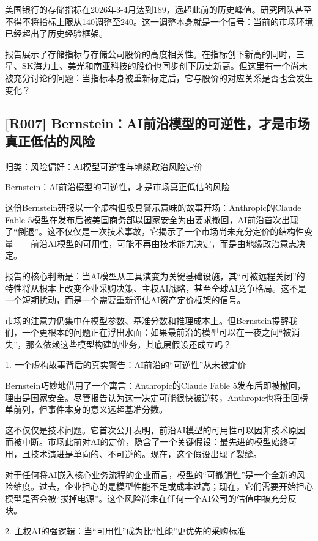 \documentclass[11pt]{ctexart}
\begin{document}
美国银行的存储指标在2026年3-4月达到189，远超此前的历史峰值。研究团队甚至不得不将指标上限从140调整至240。这一调整本身就是一个信号：当前的市场环境已经超出了历史经验框架。

报告展示了存储指标与存储公司股价的高度相关性。在指标创下新高的同时，三星、SK海力士、美光和南亚科技的股价也同步创下历史新高。但这里有一个尚未被充分讨论的问题：当指标本身被重新标定后，它与股价的对应关系是否也会发生变化？

\subsection{[R007] Bernstein：AI前沿模型的可逆性，才是市场真正低估的风险}
{\small\color{refgray}归类：风险偏好：AI模型可逆性与地缘政治风险定价}

Bernstein：AI前沿模型的可逆性，才是市场真正低估的风险

这份Bernstein研报以一个虚构但极具警示意味的故事开场：Anthropic的Claude Fable 5模型在发布后被美国商务部以国家安全为由要求撤回，AI前沿首次出现了“倒退”。这不仅仅是一次技术事故，它揭示了一个市场尚未充分定价的结构性变量——前沿AI模型的可用性，可能不再由技术能力决定，而是由地缘政治意志决定。

报告的核心判断是：当AI模型从工具演变为关键基础设施，其“可被远程关闭”的特性将从根本上改变企业采购决策、主权AI战略，甚至全球AI竞争格局。这不是一个短期扰动，而是一个需要重新评估AI资产定价框架的信号。

市场的注意力仍集中在模型参数、基准分数和推理成本上。但Bernstein提醒我们，一个更根本的问题正在浮出水面：如果最前沿的模型可以在一夜之间“被消失”，那么依赖这些模型构建的业务，其底层假设还成立吗？

1. 一个虚构故事背后的真实警告：AI前沿的“可逆性”从未被定价

Bernstein巧妙地借用了一个寓言：Anthropic的Claude Fable 5发布后即被撤回，理由是国家安全。尽管报告认为这一决定可能很快被逆转，Anthropic也将重回榜单前列，但事件本身的意义远超基准分数。

这不仅仅是技术问题。它首次公开表明，前沿AI模型的可用性可以因非技术原因而被中断。市场此前对AI的定价，隐含了一个关键假设：最先进的模型始终可用，且技术演进是单向的、不可逆的。现在，这个假设出现了裂缝。

对于任何将AI嵌入核心业务流程的企业而言，模型的“可撤销性”是一个全新的风险维度。过去，企业担心的是模型性能不足或成本过高；现在，它们需要开始担心模型是否会被“拔掉电源”。这个风险尚未在任何一个AI公司的估值中被充分反映。

2. 主权AI的强逻辑：当“可用性”成为比“性能”更优先的采购标准
\end{document}
